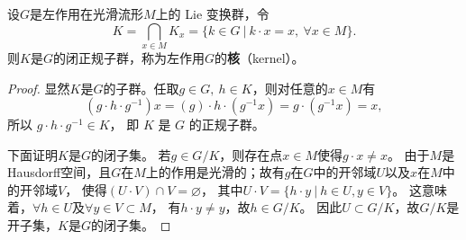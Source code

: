 \begin{theorem}\label{chlg:thm_subclosed}
    设$G$是左作用在光滑流形$M$上的 Lie 变换群，令
    \begin{equation}\label{chlg:eqn_clinvsub}
        K=\bigcap_{x\in M} K_x=\{k \in G \ |\ k \cdot x=x,\ \forall x \in M\}.
    \end{equation}
    则$K$是$G$的闭正规子群，称为左作用$G$的\textbf{核}（kernel）。
\end{theorem}
\begin{proof}
    显然$K$是$G$的子群。任取$g \in G,\ h \in K$，则对任意的$x \in M$有
    \begin{equation}
        \left(g \cdot h \cdot g^{-1}\right) x  =(g) \cdot h \cdot\left(g^{-1} x\right) 
        =g \cdot\left(g^{-1} x\right) =x,
    \end{equation}
    所以 $g \cdot h \cdot g^{-1} \in K$， 即 $K$ 是 $G$ 的正规子群。
    
    下面证明$K$是$G$的闭子集。 若$g \in G / K$，则存在点$x \in M$使得$g\cdot x \neq x$。
    由于$M$是Hausdorff空间，且$G$在$M$上的作用是光滑的；故有$g$在$G$中的开邻域$U$以及$x$在$M$中的开邻域$V$，
    使得$(U \cdot V) \cap V=\varnothing$，
    其中$U \cdot V=\{h \cdot y \ |\ h \in U, y \in V\}$。
    这意味着，$\forall h \in U$及$\forall y \in V\subset M$，
    有$h \cdot y \neq y$，故$h \in G / K$。
    因此$U \subset G / K$，故$G / K$是开子集，$K$是$G$的闭子集。
\end{proof}



